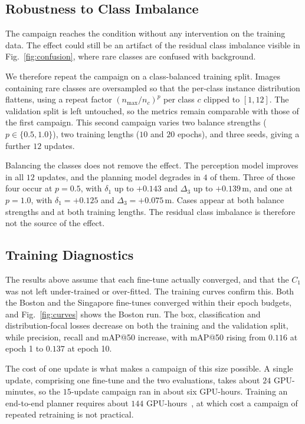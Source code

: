 \documentclass[conference]{IEEEtran}
\begin{document}
\subsection{Robustness to Class Imbalance}
\label{sec:res-balanced}
The campaign reaches the condition without any intervention on the training data.
The effect could still be an artifact of the residual class imbalance visible in
Fig.~\ref{fig:confusion}, where rare classes are confused with background.

We therefore repeat the campaign on a class-balanced training split. Images
containing rare classes are oversampled so that the per-class instance
distribution flattens, using a repeat factor $(n_{\max}/n_c)^{p}$ per class $c$
clipped to $[1,12]$. The validation split is left untouched, so the metrics
remain comparable with those of the first campaign. This second campaign varies
two balance strengths ($p \in \{0.5, 1.0\}$), two training lengths ($10$ and $20$
epochs), and three seeds, giving a further $12$ updates.

Balancing the classes does not remove the effect. The perception model improves in all
$12$ updates, and the planning model degrades in $4$ of them. Three of those four occur
at $p = 0.5$, with $\delta_1$ up to $+0.143$ and $\Delta_3$ up to $+0.139$\,m,
and one at $p = 1.0$, with $\delta_1 = +0.125$ and $\Delta_3 = +0.075$\,m. Cases
appear at both balance strengths and at both training lengths. The residual class
imbalance is therefore not the source of the effect.

\subsection{Training Diagnostics}
\label{sec:res-diag}
The results above assume that each fine-tune actually converged, and that the
$C_1$ was not left under-trained or over-fitted. The training curves confirm
this. Both the Boston and the Singapore fine-tunes converged within their epoch
budgets, and Fig.~\ref{fig:curves} shows the Boston run. The box, classification
and distribution-focal losses decrease on both the training and the validation
split, while precision, recall and mAP@50 increase, with mAP@50 rising from
$0.116$ at epoch 1 to $0.137$ at epoch 10.

The cost of one update is what makes a campaign of this size possible. A single
update, comprising one fine-tune and the two evaluations, takes about $24$
GPU-minutes, so the $15$-update campaign ran in about six GPU-hours. Training an
end-to-end planner requires about $144$ GPU-hours~\cite{sun2024sparsedrive}, at
which cost a campaign of repeated retraining is not practical.
\end{document}
